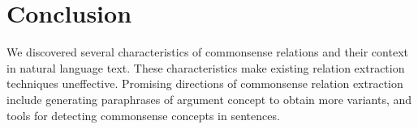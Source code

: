 \documentclass[11pt,a4paper]{article}
\begin{document}
\section{Conclusion}
We discovered several characteristics of commonsense relations
and their context in natural language text. These characteristics
make existing relation extraction techniques uneffective.
Promising directions of commonsense relation extraction include 
generating paraphrases of argument concept to obtain more variants,
and tools for detecting commonsense concepts in sentences.

%
%
%
\begin{comment}
In this paper, we first experiments to extract commonsense relation from text using a typical factual relation extraction model. Compared with good test results on factual relation, evaluations metrics including P@N, AUC and F1 decline sharply. We give several explanations for why factual relation extraction method can't be directly applied on commonsense relation. 
The semantic features of concept block us from collecting enough size of training data and introduce noise in already-found data. On the other side, the wide coverage of commonsense relation results in greater variety of patterns between head and tail concept, leading to a consequent need of larger quantity of training data.
	The combination of intrinsic features of commonsense concept and relation deteriorates extraction performance. Future works on automatically mining commonsense relation from text could focus on solving these issues. 
	
\end{comment}



\end{document}

